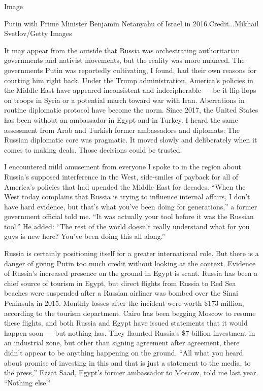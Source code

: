 Image

Putin with Prime Minister Benjamin Netanyahu of Israel in
2016.Credit...Mikhail Svetlov/Getty Images

It may appear from the outside that Russia was orchestrating
authoritarian governments and nativist movements, but the reality was
more nuanced. The governments Putin was reportedly cultivating, I found,
had their own reasons for courting him right back. Under the Trump
administration, America's policies in the Middle East have appeared
inconsistent and indecipherable --- be it flip-flops on troops in Syria
or a potential march toward war with Iran. Aberrations in routine
diplomatic protocol have become the norm. Since 2017, the United States
has been without an ambassador in Egypt and in Turkey. I heard the same
assessment from Arab and Turkish former ambassadors and diplomats: The
Russian diplomatic core was pragmatic. It moved slowly and deliberately
when it comes to making deals. Those decisions could be trusted.

I encountered mild amusement from everyone I spoke to in the region
about Russia's supposed interference in the West, side-smiles of payback
for all of America's policies that had upended the Middle East for
decades. ``When the West today complains that Russia is trying to
influence internal affairs, I don't have hard evidence, but that's what
you've been doing for generations,'' a former government official told
me. ``It was actually your tool before it was the Russian tool.'' He
added: ``The rest of the world doesn't really understand what for you
guys is new here? You've been doing this all along.''

Russia is certainly positioning itself for a greater international role.
But there is a danger of giving Putin too much credit without looking at
the context. Evidence of Russia's increased presence on the ground in
Egypt is scant. Russia has been a chief source of tourism in Egypt, but
direct flights from Russia to Red Sea beaches were suspended after a
Russian airliner was bombed over the Sinai Peninsula in 2015. Monthly
losses after the incident were worth \$173 million, according to the
tourism department. Cairo has been begging Moscow to resume these
flights, and both Russia and Egypt have issued statements that it would
happen soon --- but nothing has. They flaunted Russia's \$7 billion
investment in an industrial zone, but other than signing agreement after
agreement, there didn't appear to be anything happening on the ground.
``All what you heard about promise of investing in this and that is just
a statement to the media, to the press,'' Ezzat Saad, Egypt's former
ambassador to Moscow, told me last year. ``Nothing else.''

